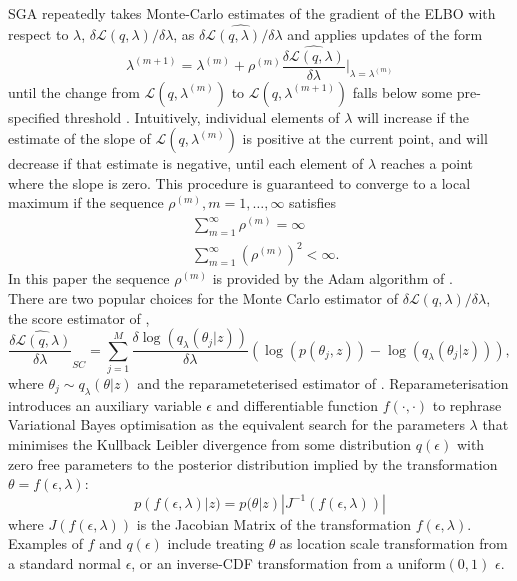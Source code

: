 \documentclass[12pt,a4paper]{article}\usepackage[]{graphicx}\usepackage[]{color}
\begin{document}
SGA repeatedly takes Monte-Carlo estimates of the gradient of the ELBO with respect to $\lambda$, $\delta\mathcal{L}(q, \lambda) / \delta \lambda$, as $\widehat{\delta\mathcal{L}(q, \lambda) / \delta \lambda}$ and applies updates of the form
\begin{equation}
\label{gradientAscent}
\lambda^{(m+1)} = \lambda^{(m)} + \rho^{(m)} \widehat{\frac{\delta\mathcal{L}(q, \lambda)}{\delta \lambda}} \bigg\rvert_{\lambda = \lambda^{(m)}}
\end{equation}
until the change from $\mathcal{L}(q, \lambda^{(m)})$ to $\mathcal{L}(q, \lambda^{(m+1)})$ falls below some pre-specified threshold \citep{Hoffman2013}. Intuitively, individual elements of $\lambda$ will increase if the estimate of the slope of $\mathcal{L}(q, \lambda^{(m)})$ is positive at the current point, and will decrease if that estimate is negative, until each element of $\lambda$ reaches a point where the slope is zero. This procedure is guaranteed to converge to a local maximum \citep{Robbins1951} if the sequence $\rho^{(m)}, m = 1, \dots, \infty$ satisfies
\begin{align}
&\sum_{m=1}^{\infty} \rho^{(m)} =  \infty \\
&\sum_{m=1}^{\infty} (\rho^{(m)})^2 <  \infty.
\end{align}
In this paper the sequence $\rho^{(m)}$ is provided by the Adam algorithm of \citet{Kingma2015b}.
\\

There are two popular choices for the Monte Carlo estimator of $\delta\mathcal{L}(q, \lambda) / \delta \lambda$, the score estimator of \citet{Ranganath2014}, 
\begin{equation}
\label{scoreDeriv}
\widehat{\frac{\delta\mathcal{L}(q, \lambda)}{\delta \lambda}}_{SC} = \sum_{j = 1}^M \frac{\delta \log(q_{\lambda}(\theta_j | z))}{\delta \lambda} \left(\log(p(\theta_j, z)) - \log(q_{\lambda}(\theta_j | z)) \right),
\end{equation}
where $\theta_j \sim q_{\lambda}(\theta | z)$ and the reparameteterised estimator of \citet{Kingma2014}. Reparameterisation introduces an auxiliary variable $\epsilon$ and differentiable function $f(\cdot, \cdot)$ to rephrase Variational Bayes optimisation as the equivalent search for the parameters $\lambda$ that minimises the Kullback Leibler divergence from some distribution $q(\epsilon)$ with zero free parameters to the posterior distribution implied by the transformation $\theta = f(\epsilon, \lambda)$:
\begin{equation}
\label{rpDist}
p(f(\epsilon, \lambda) | z) = p(\theta | z) |J^{-1}(f(\epsilon, \lambda))|
\end{equation}
where $J(f(\epsilon, \lambda))$ is the Jacobian Matrix of the transformation $f(\epsilon, \lambda)$. Examples of $f$ and $q(\epsilon)$ include treating $\theta$ as location scale transformation from a standard normal $\epsilon$, or an inverse-CDF transformation from a uniform$(0, 1)$ $\epsilon$. 
\\
\end{document}
